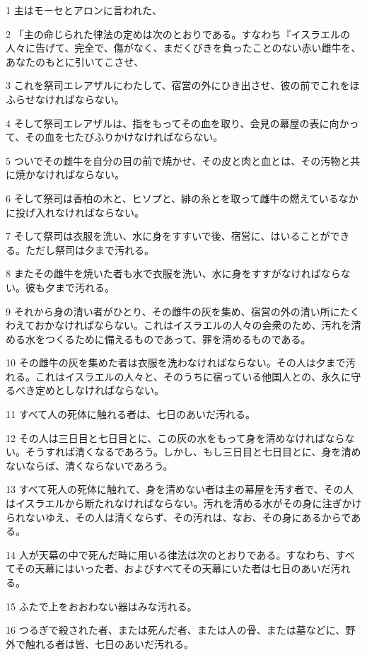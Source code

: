 \par 1 主はモーセとアロンに言われた、
\par 2 「主の命じられた律法の定めは次のとおりである。すなわち『イスラエルの人々に告げて、完全で、傷がなく、まだくびきを負ったことのない赤い雌牛を、あなたのもとに引いてこさせ、
\par 3 これを祭司エレアザルにわたして、宿営の外にひき出させ、彼の前でこれをほふらせなければならない。
\par 4 そして祭司エレアザルは、指をもってその血を取り、会見の幕屋の表に向かって、その血を七たびふりかけなければならない。
\par 5 ついでその雌牛を自分の目の前で焼かせ、その皮と肉と血とは、その汚物と共に焼かなければならない。
\par 6 そして祭司は香柏の木と、ヒソプと、緋の糸とを取って雌牛の燃えているなかに投げ入れなければならない。
\par 7 そして祭司は衣服を洗い、水に身をすすいで後、宿営に、はいることができる。ただし祭司は夕まで汚れる。
\par 8 またその雌牛を焼いた者も水で衣服を洗い、水に身をすすがなければならない。彼も夕まで汚れる。
\par 9 それから身の清い者がひとり、その雌牛の灰を集め、宿営の外の清い所にたくわえておかなければならない。これはイスラエルの人々の会衆のため、汚れを清める水をつくるために備えるものであって、罪を清めるものである。
\par 10 その雌牛の灰を集めた者は衣服を洗わなければならない。その人は夕まで汚れる。これはイスラエルの人々と、そのうちに宿っている他国人との、永久に守るべき定めとしなければならない。
\par 11 すべて人の死体に触れる者は、七日のあいだ汚れる。
\par 12 その人は三日目と七日目とに、この灰の水をもって身を清めなければならない。そうすれば清くなるであろう。しかし、もし三日目と七日目とに、身を清めないならば、清くならないであろう。
\par 13 すべて死人の死体に触れて、身を清めない者は主の幕屋を汚す者で、その人はイスラエルから断たれなければならない。汚れを清める水がその身に注ぎかけられないゆえ、その人は清くならず、その汚れは、なお、その身にあるからである。
\par 14 人が天幕の中で死んだ時に用いる律法は次のとおりである。すなわち、すべてその天幕にはいった者、およびすべてその天幕にいた者は七日のあいだ汚れる。
\par 15 ふたで上をおおわない器はみな汚れる。
\par 16 つるぎで殺された者、または死んだ者、または人の骨、または墓などに、野外で触れる者は皆、七日のあいだ汚れる。
